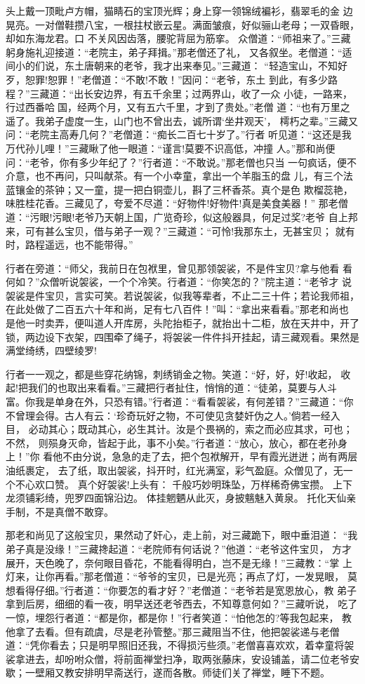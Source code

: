 头上戴一顶毗卢方帽，猫睛石的宝顶光辉；身上穿一领锦绒褊衫，翡翠毛的金
边晃亮。一对僧鞋攒八宝，一根拄杖嵌云星。满面皱痕，好似骊山老母；一双昏眼，
却如东海龙君。口
不关风因齿落，腰驼背屈为筋挛。
众僧道：“师祖来了。”三藏躬身施礼迎接道：“老院主，弟子拜揖。”那老僧还了礼，
又各叙坐。老僧道：“适间小的们说，东土唐朝来的老爷，我才出来奉见。”三藏道：
“轻造宝山，不知好歹，恕罪!恕罪！”老僧道：“不敢!不敢！”因问：“老爷，东土
到此，有多少路程？”三藏道：“出长安边界，有五千余里；过两界山，收了一众
小徒，一路来，行过西番哈国，经两个月，又有五六千里，才到了贵处。”老僧
道：“也有万里之遥了。我弟子虚度一生，山门也不曾出去，诚所谓‘坐井观天’，
樗朽之辈。”三藏又问：“老院主高寿几何？”老僧道：“痴长二百七十岁了。”行者
听见道：“这还是我万代孙儿哩！”三藏瞅了他一眼道：“谨言!莫要不识高低，冲撞
人。”那和尚便问：“老爷，你有多少年纪了？”行者道：“不敢说。”那老僧也只当
一句疯话，便不介意，也不再问，只叫献茶。有一个小幸童，拿出一个羊脂玉的盘
儿，有三个法蓝镶金的茶钟；又一童，提一把白铜壶儿，斟了三杯香茶。真个是色
欺榴蕊艳，味胜桂花香。三藏见了，夸爱不尽道：“好物件!好物件!真是美食美器！”
那老僧道：“污眼!污眼!老爷乃天朝上国，广览奇珍，似这般器具，何足过奖?老爷
自上邦来，可有甚么宝贝，借与弟子一观？”三藏道：“可怜!我那东土，无甚宝贝；
就有时，路程遥远，也不能带得。”

行者在旁道：“师父，我前日在包袱里，曾见那领袈裟，不是件宝贝?拿与他看
看何如？”众僧听说袈裟，一个个冷笑。行者道：“你笑怎的？”院主道：“老爷才
说袈裟是件宝贝，言实可笑。若说袈裟，似我等辈者，不止二三十件；若论我师祖，
在此处做了二百五六十年和尚，足有七八百件！”叫：“拿出来看看。”那老和尚也
是他一时卖弄，便叫道人开库房，头陀抬柜子，就抬出十二柜，放在天井中，开了
锁，两边设下衣架，四围牵了绳子，将袈裟一件件抖开挂起，请三藏观看。果然是
满堂绮绣，四壁绫罗!

行者一一观之，都是些穿花纳锦，刺绣销金之物。笑道：“好，好，好!收起，
收起!把我们的也取出来看看。”三藏把行者扯住，悄悄的道：“徒弟，莫要与人斗
富。你我是单身在外，只恐有错。”行者道：“看看袈裟，有何差错？”三藏道：“你
不曾理会得。古人有云：‘珍奇玩好之物，不可使见贪婪奸伪之人。’倘若一经入目，
必动其心；既动其心，必生其计。汝是个畏祸的，索之而必应其求，可也；不然，
则殒身灭命，皆起于此，事不小矣。”行者道：“放心，放心，都在老孙身上！”你
看他不由分说，急急的走了去，把个包袱解开，早有霞光迸迸；尚有两层油纸裹定，
去了纸，取出袈裟，抖开时，红光满室，彩气盈庭。众僧见了，无一个不心欢口赞。
真个好袈裟!上头有：
千般巧妙明珠坠，万样稀奇佛宝攒。
上下龙须铺彩绮，兜罗四面锦沿边。
体挂魍魉从此灭，身披魑魅入黄泉。
托化天仙亲手制，不是真僧不敢穿。

那老和尚见了这般宝贝，果然动了奸心，走上前，对三藏跪下，眼中垂泪道：
“我弟子真是没缘！”三藏搀起道：“老院师有何话说？”他道：“老爷这件宝贝，
方才展开，天色晚了，奈何眼目昏花，不能看得明白，岂不是无缘！”三藏教：“掌
上灯来，让你再看。”那老僧道：“爷爷的宝贝，已是光亮；再点了灯，一发晃眼，
莫想看得仔细。”行者道：“你要怎的看才好？”老僧道：“老爷若是宽恩放心，教
弟子拿到后房，细细的看一夜，明早送还老爷西去，不知尊意何如？”三藏听说，
吃了一惊，埋怨行者道：“都是你，都是你！”行者笑道：“怕他怎的?等我包起来，
教他拿了去看。但有疏虞，尽是老孙管整。”那三藏阻当不住，他把袈裟递与老僧
道：“凭你看去；只是明早照旧还我，不得损污些须。”老僧喜喜欢欢，着幸童将袈
裟拿进去，却吩咐众僧，将前面禅堂扫净，取两张藤床，安设铺盖，请二位老爷安
歇；一壁厢又教安排明早斋送行，遂而各散。师徒们关了禅堂，睡下不题。

